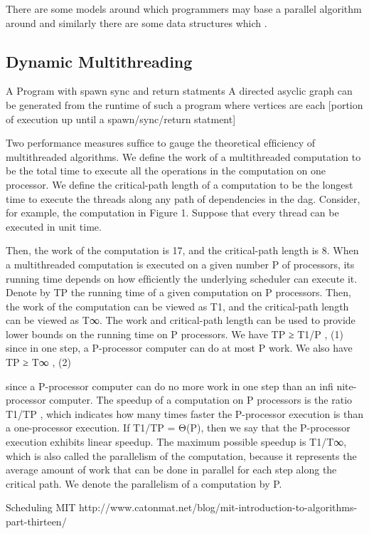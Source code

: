 \documentclass[main.tex]{subfiles}
\begin{document}
{{There are some models around which programmers may base a parallel algorithm around and similarly there are some data structures which .


\subsection{Dynamic Multithreading}

A Program with spawn sync and return statments
A directed asyclic graph can be generated from the runtime of such a program where vertices are each [portion of execution up until a spawn/sync/return statment]

Two performance measures sufﬁce to gauge the theoretical efﬁciency of multithreaded algorithms. We deﬁne the work  of a multithreaded computation to be the total time to execute all the operations in the computation on one processor. We deﬁne the critical-path length  of a computation to be the longest time to execute the threads along any path of dependencies in the dag. Consider, for example, the computation in Figure 1. Suppose that every thread can be executed in unit time.

Then, the work of the computation is 17, and the critical-path length is 8. When a multithreaded computation is executed on a given number P of processors, its running time depends on how efﬁciently the underlying scheduler can execute it. Denote by TP the running time of a given computation on P processors. Then, the work of the computation can be viewed as T1, and the critical-path length can be viewed as T∞. The work and critical-path length can be used to provide lower bounds on the running time on P processors.
We have TP ≥ T1/P , (1)
since in one step, a P-processor computer can do at most P work.
We also have TP ≥ T∞ , (2)

since a P-processor computer can do no more work in one step than an inﬁ nite-processor computer. The speedup of a computation on P processors is the ratio T1/TP , which indicates how many times faster the P-processor execution is than a one-processor execution. If T1/TP = Θ(P), then
we say that the P-processor execution exhibits linear speedup. The maximum possible speedup is T1/T∞, which is also called the parallelism of the computation, because it represents the average amount of work that can be done in parallel for each step along the critical path. We denote the parallelism of a computation by P.


Scheduling
MIT http://www.catonmat.net/blog/mit-introduction-to-algorithms-part-thirteen/

}}
\end{document}

